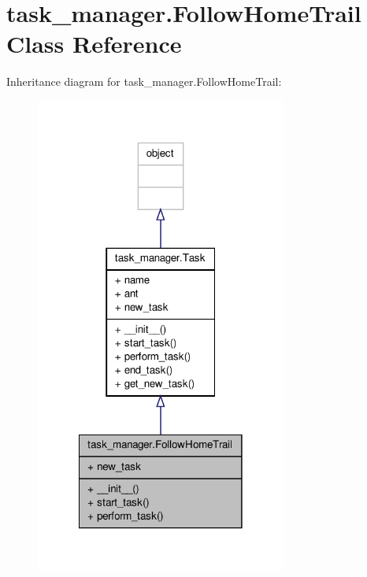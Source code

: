 \hypertarget{classtask__manager_1_1FollowHomeTrail}{\section{task\+\_\+manager.\+Follow\+Home\+Trail Class Reference}
\label{classtask__manager_1_1FollowHomeTrail}
}


Inheritance diagram for task\+\_\+manager.\+Follow\+Home\+Trail\+:\nopagebreak
\begin{figure}[H]
\begin{center}
\leavevmode
\includegraphics[width=234pt]{classtask__manager_1_1FollowHomeTrail__inherit__graph}
\end{center}
\end{figure}


